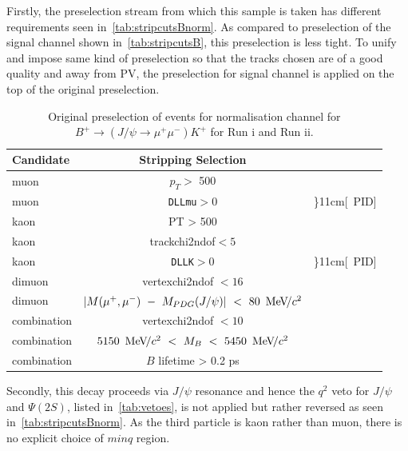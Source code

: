 Firstly, the preselection stream from which this sample is taken has different requirements seen in~\autoref{tab:stripcutsBnorm}. As compared to preselection of the signal channel shown in~\autoref{tab:stripcutsB}, this preselection is less tight. To unify and impose same kind of preselection so that the tracks chosen are of a good quality and away from \gls{PV}, the preselection for signal channel is applied on the top of the original preselection.


\begin{table}%
\begin{center}
\begin{tabular}{l|c l }

    \toprule
     Candidate & Stripping Selection \\ \hline

	muon & $p_{T} >$ 500 \mev \\ 

	
	muon & \texttt{DLLmu}$ > 0$ & \rdelim\}{1}{1cm}[\ \gls{PID}] \\ \hline

	kaon & PT > 500 \mev \\ 
	kaon & \gls{trackchi2ndof}$ < 5$ \\
	kaon & \texttt{DLLK}$ > 0$ & \rdelim\}{1}{1cm}[\ \gls{PID}] \\ \hline

	dimuon & \gls{vertexchi2ndof} $< 16$ \\
	dimuon & $| M(\mu^{+},\mu^{-})\ -\ M_{PDG}(J/\psi)|\ <\ 80\ {\mathrm{\,Me\kern -0.1em V\!/}c^2}$ \\ \hline

	combination & \gls{vertexchi2ndof} $< 10$ \\
	combination & $5150\ \mevcc\ <\ M_B\ <\ 5450\ \mevcc$ \\
	combination & $B$ lifetime > 0.2 ps \\ \bottomrule
     \end{tabular}

\end{center}
	\caption{Original preselection of events for normalisation channel for $B^{+} \rightarrow (J/\psi \rightarrow \mu^{+} \mu^{-}) K^{+}$ for Run \Rn{1} and Run \Rn{2}. }
\label{tab:stripcutsBnorm}
\end{table}


Secondly, this decay proceeds via $J/\psi$ resonance and hence the $q^{2}$ veto for $J/\psi$ and $\Psi{(2S)}$, listed in~\autoref{tab:vetoes}, is not applied but rather reversed as seen in~\autoref{tab:stripcutsBnorm}. As the third particle is kaon rather than muon, there is no explicit choice of $minq$ region.

